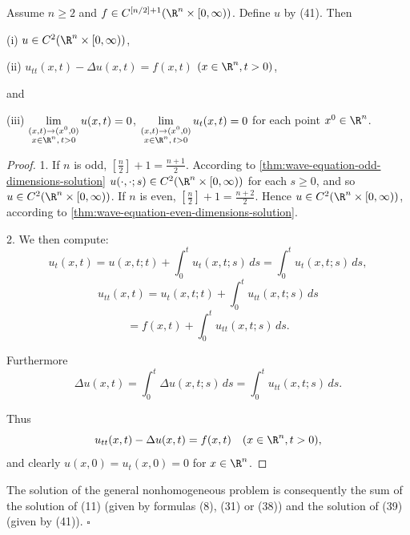 \begin{theorem}
\label{thm:wave-equation-nonhomogeneous-duhamel}
Assume $n \geq 2$ and $f \in C^{[n/2]+1}(\R^n\times[0,\infty))$. Define $u$ by (41). Then

(i) $u \in C^2(\R^n \times [0,\infty))$,

(ii) $u_{tt}(x,t) - \Delta u(x,t) = f(x,t)$ $(x \in \R^n, t>0)$,

and

(iii) $\lim\limits_{\substack{(x,t)\to(x^0,0) \\ x\in\R^n,\,t>0}} u(x,t) = 0$, $\lim\limits_{\substack{(x,t)\to(x^0,0) \\ x\in\R^n,\,t>0}} u_t(x,t) = 0$ for each point $x^0 \in \R^n$.
\end{theorem}

\begin{proof}
1. If $n$ is odd, $[\frac{n}{2}]+1 = \frac{n+1}{2}$. According to \cref{thm:wave-equation-odd-dimensions-solution} $u(\cdot,\cdot;s) \in C^2(\R^n\times[0,\infty))$ for each $s \geq 0$, and so $u \in C^2(\R^n\times[0,\infty))$. If $n$ is even, $[\frac{n}{2}]+1 = \frac{n+2}{2}$. Hence $u \in C^2(\R^n\times[0,\infty))$, according to \cref{thm:wave-equation-even-dimensions-solution}.

2. We then compute:
$$u_t(x,t) = u(x,t;t) + \int_0^t u_t(x,t;s)\,ds = \int_0^t u_t(x,t;s)\,ds,$$
$$u_{tt}(x,t) = u_t(x,t;t) + \int_0^t u_{tt}(x,t;s)\,ds$$
$$= f(x,t) + \int_0^t u_{tt}(x,t;s)\,ds.$$

Furthermore
$$\Delta u(x,t) = \int_0^t \Delta u(x, t; s) \, ds = \int_0^t u_{tt}(x, t; s) \, ds.$$

Thus
$$u_{tt}(x,t) - \Delta u(x,t) = f(x,t) \quad (x \in \R^n, t > 0),$$
and clearly $u(x,0) = u_t(x,0) = 0$ for $x \in \R^n$.
\end{proof}

\begin{remark}
\label{rem:wave-equation-general-nonhomogeneous-solution}
The solution of the general nonhomogeneous problem is consequently the sum of the solution of (11) (given by formulas (8), (31) or (38)) and the solution of (39) (given by (41)). $\square$
\end{remark}

